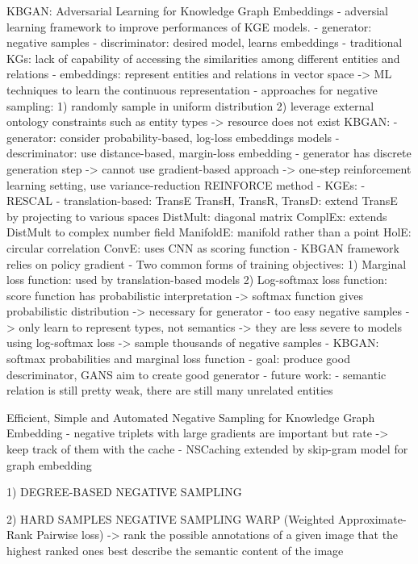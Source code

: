\cite{cai2017kbgan}
KBGAN: Adversarial Learning for Knowledge Graph Embeddings
- adversial learning framework to improve performances of KGE models.
- generator: negative samples
- discriminator: desired model, learns embeddings
- traditional KGs: lack of capability of accessing the similarities among different entities and relations
- embeddings: represent entities and relations in vector space -> ML techniques to learn the continuous representation
- approaches for negative sampling:
1) randomly sample in uniform distribution
2) leverage external ontology constraints such as entity types
-> resource does not exist
KBGAN:
- generator: consider probability-based, log-loss embeddings models 
- descriminator: use distance-based, margin-loss embedding
- generator has discrete generation step -> cannot use gradient-based approach
-> one-step reinforcement learning setting, use variance-reduction REINFORCE method 
- KGEs: 
    - RESCAL
    - translation-based:
        TransE
        TransH, TransR, TransD: extend TransE by projecting to various spaces
        DistMult: diagonal matrix
        ComplEx: extends DistMult to complex number field
        ManifoldE: manifold rather than a point
        HolE: circular correlation
        ConvE: uses CNN as scoring function
- KBGAN framework relies on policy gradient
- Two common forms of training objectives:
    1) Marginal loss function: used by translation-based models
    2) Log-softmax loss function: score function has probabilistic interpretation
    -> softmax function gives probabilistic distribution -> necessary for generator
- too easy negative samples -> only learn to represent types, not semantics
-> they are less severe to models using log-softmax loss -> sample thousands of negative samples
- KBGAN: softmax probabilities and marginal loss function
- goal: produce good descriminator, GANS aim to create good generator
- future work:
    - semantic relation is still pretty weak, there are still many unrelated entities 

    
\cite{zhang2020efficient}
Efficient, Simple and Automated Negative Sampling for Knowledge Graph Embedding
- negative triplets with large gradients are important but rate 
-> keep track of them with the cache
- NSCaching extended by skip-gram model for graph embedding





1) DEGREE-BASED NEGATIVE SAMPLING
    
    
2) HARD SAMPLES NEGATIVE SAMPLING
    WARP (Weighted Approximate-Rank Pairwise loss)
        -> rank the possible annotations of a given image that the highest ranked ones best describe the semantic content of the image
    
